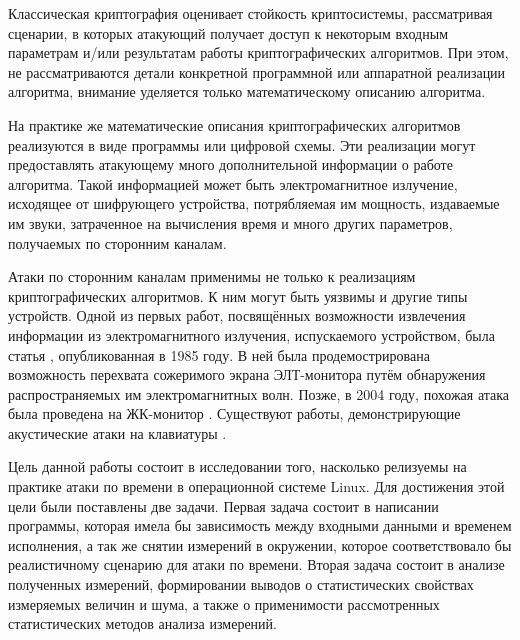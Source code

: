 
Классическая криптография оценивает стойкость криптосистемы, рассматривая
сценарии, в которых атакующий получает доступ к некоторым входным параметрам
и/или результатам работы криптографических алгоритмов. При этом, не
рассматриваются детали конкретной программной или аппаратной реализации
алгоритма, внимание уделяется только математическому описанию алгоритма.

На практике же математические описания криптографических алгоритмов реализуются
в виде программы или цифровой схемы. Эти реализации могут предоставлять
атакующему много дополнительной информации о работе алгоритма. Такой информацией
может быть электромагнитное излучение, исходящее от шифрующего устройства,
потрябляемая им мощность, издаваемые им звуки, затраченное на вычисления время и
много других параметров, получаемых по сторонним каналам.

Атаки по сторонним каналам применимы не только к реализациям криптографических
алгоритмов. К ним могут быть уязвимы и другие типы устройств. Одной из первых
работ, посвящённых возможности извлечения информации из электромагнитного
излучения, испускаемого устройством, была статья \cite{van-eck}, опубликованная
в 1985 году. В ней была продемострирована возможность перехвата сожеримого
экрана ЭЛТ-монитора путём обнаружения распространяемых им электромагнитных волн.
Позже, в 2004 году, похожая атака была проведена на ЖК-монитор \cite{kuhn}.
Существуют работы, демонстрирующие акустические атаки на клавиатуры
\cite{asonov} \cite{zhuang}.

Цель данной работы состоит в исследовании того, насколько релизуемы на практике
атаки по времени в операционной системе Linux. Для достижения этой цели были
поставлены две задачи. Первая задача состоит в написании программы, которая
имела бы зависимость между входными данными и временем исполнения, а так же
снятии измерений в окружении, которое соответствовало бы реалистичному сценарию
для атаки по времени. Вторая задача состоит в анализе полученных измерений,
формировании выводов о статистических свойствах измеряемых величин и шума, а
также о применимости рассмотренных статистических методов анализа измерений.

\clearpage
